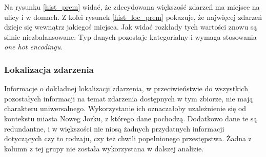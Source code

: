 \documentclass{classrep}
\begin{document}
{{{                Na rysunku \ref{hist_prem} widać, że zdecydowana większość zdarzeń ma
                miejsce na ulicy i w domach. Z kolei rysunek \ref{hist_loc_prem}
                pokazuje, że najwięcej zdarzeń dzieje się wewnątrz jakiegoś miejsca.
                Jak widać rozkłady tych wartości znowu są silnie niezbalansowane. Typ
                danych pozostaje kategorialny i wymaga stosowania \emph{one hot
                encodingu}.
            }

            \subsubsection{Lokalizacja zdarzenia} {
                Informacje o dokładnej lokalizacji zdarzenia, w przeciwieństwie do
                wszystkich pozostałych informacji na temat zdarzenia dostępnych w tym
                zbiorze, nie mają charakteru uniwersalnego. Wykorzystanie ich
                oznaczałoby uzależnienie się od kontekstu miasta Noweg Jorku, z którego
                dane pochodzą. Dodatkowo dane te są redundantne, i w większości nie
                niosą żadnych przydatnych informacji dotyczących czy to rodzaju, czy
                też chwili popełnionego przestępstwa. Żadna z kolumn z tej grupy nie
                została wykorzystana w dalszej analizie.
            }

}}
\end{document}
